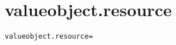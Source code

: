 \section{valueobject.resource}
\label{configuration:ValueobjectResource}
\ClearAPI
\TODO
{}
\begin{lstlisting}[style=Props,caption={Usage example for \textit{valueobject.resource}}]
valueobject.resource=
\end{lstlisting}